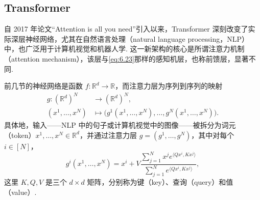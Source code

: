 \subsection{Transformer}\label{sec:6.6}

自 2017 年论文“Attention is all you need”\cite{ref313}引入以来，Transformer 深刻改变了实际深层神经网络，尤其在自然语言处理（natural language processing，NLP）中，也广泛用于计算机视觉和机器人学. 这一新架构的核心是所谓注意力机制（attention mechanism），该层与\eqref{eq:6.23}那样的感知机层，也称前馈层，显著不同.

前几节的神经网络是函数 $f:\mathbb R^d\to\mathbb R$，而注意力层为序列到序列的映射
$$
\begin{aligned}
g:(\mathbb R^d)^N&\longrightarrow(\mathbb R^d)^N,\\
(x^1,\ldots,x^N)&\longmapsto
\bigl(g^1(x^1,\ldots,x^N),\ldots,g^N(x^1,\ldots,x^N)\bigr).
\end{aligned}
$$
具体地，输入——NLP 中的句子或计算机视觉中的图像——被拆分为词元（token）$x^1,\ldots,x^N\in\mathbb R^d$，并通过注意力层 $g=(g^1,\ldots,g^N)$，其中对每个 $i\in[N]$，
$$
g^i(x^1,\ldots,x^N)=x^i+V\frac{\sum_{j=1}^Nx^je^{\langle Qx^i,Kx^j\rangle}}
{\sum_{j=1}^Ne^{\langle Qx^i,Kx^j\rangle}},
$$
这里 $K,Q,V$ 是三个 $d\times d$ 矩阵，分别称为键（key）、查询（query）和值（value）.

